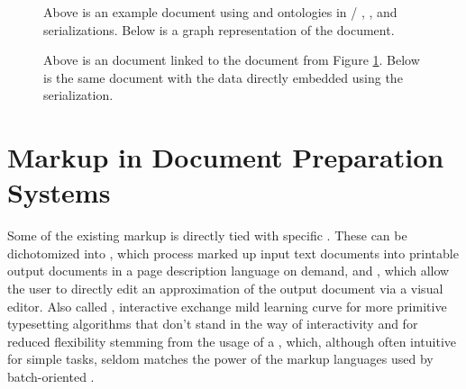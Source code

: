 \documentclass{book}
\begin{document}
\begin{figure}
  \caption{Above is an example  document using  and
     ontologies in /%
    , , and %
     serializations. Below is a graph representation of the
    document.}\label{fig:rdf-doc}\bigskip
  
\end{figure}

\begin{figure}[t!]
  \caption{Above is an  document linked to the 
    document from Figure \ref{fig:rdf-doc}. Below is the same 
    document with the  data directly embedded using the
     serialization.}\bigskip
\end{figure}

        
\section{Markup in Document Preparation Systems}
Some of the existing markup is directly tied with specific . These
 can be dichotomized into %
, which process marked up input
text documents into printable output documents in a page description language on
demand, and , which
allow the user to directly edit an approximation of the output document via a
visual editor. Also called , interactive  exchange
mild learning curve for more primitive typesetting algorithms that don't stand
in the way of interactivity and for reduced flexibility stemming from the usage
of a , which, although often intuitive for simple tasks, seldom
matches the power of the markup languages used by batch-oriented .
\end{document}
